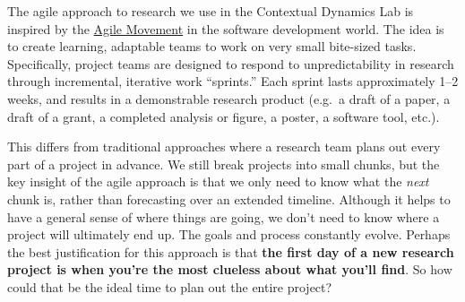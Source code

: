\documentclass{tufte-book} %
\begin{document}

\noindent The agile approach to research we use in the Contextual
Dynamics Lab is inspired by the
\href{http://scrumtrainingseries.com/}{Agile Movement} in the software
development world.  The idea is to create learning, adaptable teams to
work on very small bite-sized tasks.  Specifically, project teams are
designed to respond to unpredictability in research through
incremental, iterative work ``sprints.''  Each sprint lasts
approximately 1--2 weeks, and results in a demonstrable research
product (e.g.\ a draft of a paper, a draft of a grant, a completed
analysis or figure, a poster, a software tool, etc.).

This differs from traditional approaches where a research team
plans out every part of a project in advance.  We still break projects into small
chunks, but the key insight of the agile approach is that we only need
to know what the \textit{next} chunk is, rather than forecasting over an extended timeline.  Although it helps
to have a general sense of where things are going, we don't
need to know where a project will ultimately end up.  The
goals and process constantly evolve.  Perhaps the best
justification for this approach is that \textbf{the first day of a new
  research project is when you're the most clueless about what you'll
  find}.  So how could that be the ideal time to plan out the
entire project?
\end{document}
